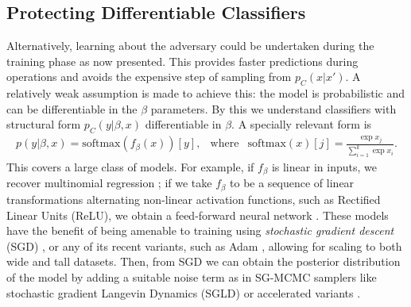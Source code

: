  
 
 \subsection{Protecting Differentiable Classifiers}\label{sec:uncs}
 
Alternatively, learning about the adversary 
could be undertaken during the training phase as now 
presented. This provides faster predictions during operations and avoids the expensive step of sampling from $p_C(x \vert x')$.
A relatively weak assumption is made to achieve this: 
the model is probabilistic and can be differentiable in the $\beta$ parameters.
By this we understand classifiers with structural form 
$p_C(y|\beta,x)$ differentiable in $\beta$. 
A specially relevant form %
is 
%
\begin{eqnarray}\label{TGF}
p(y|\beta, x) = \mbox{softmax} (f_\beta (x))[y], & \text{where} & \mbox{softmax}(x)[j] = \frac{\exp{x_j}}{\sum_{i=1}^k \exp{x_i} }. 
\end{eqnarray}
%
This covers a large class of models. For example,
if $f_\beta$ is linear in inputs, %
we recover multinomial regression 
\cite{mccullagh1989generalized}; if we take $f_\beta$ to be a sequence of linear transformations alternating non-linear activation functions, such as Rectified Linear Units (ReLU), we obtain a feed-forward neural network \cite{10.5555/3086952}. 
These models have the benefit of being amenable to training using \emph{stochastic gradient descent} (SGD) \cite{bottou2010large},
or any of its recent variants, such as Adam \cite{kingma2014adam}, 
allowing for scaling to both wide and tall datasets. Then, from SGD we can obtain the posterior distribution of the model by adding a suitable noise term as in SG-MCMC samplers like stochastic gradient Langevin Dynamics (SGLD) \cite{welling2011bayesian} or accelerated variants \cite{ma2015complete}.

